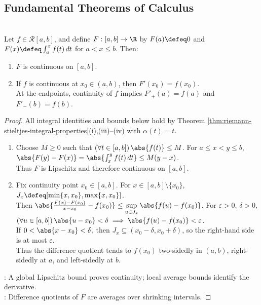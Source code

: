 \subsection{Fundamental Theorems of Calculus}

\begin{theorem} \label{thm:integral-function-continuity-and-derivative} \\
Let $f\in\mathcal{R}[a,b]$, and define $F:[a,b]\to\R$ by $F(a)\defeq0$ and $F(x)\defeq\int_a^x f(t)\,dt$ for $a<x\leq b$. Then:
\begin{enumerate}[label=(\roman*)]
\setlength{\itemsep}{0pt}
\item $F$ is continuous on $[a,b]$.
\item If $f$ is continuous at $x_0\in(a,b)$, then $F'(x_0)=f(x_0)$.\\
At the endpoints, continuity of $f$ implies $F'_+(a)=f(a)$ and $F'_-(b)=f(b)$.
\end{enumerate}
\begin{proof}
All integral identities and bounds below hold by Theorem \ref{thm:riemann-stieltjes-integral-properties}(i),(iii)--(iv) with $\alpha(t)=t$.
\begin{enumerate}[label=(\roman*)]
\setlength{\itemsep}{0pt}
\item Choose $M\geq0$ such that $(\forall t\in[a,b])\,\abs{f(t)}\leq M$. For $a\leq x<y\leq b$, $\abs{F(y)-F(x)}=\abs{\int_x^y f(t)\,dt}\leq M(y-x)$.\\
Thus $F$ is Lipschitz and therefore continuous on $[a,b]$.
\item Fix continuity point $x_0\in[a,b]$. For $x\in[a,b]\setminus\{x_0\}$, $J_x\defeq[\min\{x,x_0\},\max\{x,x_0\}]$.\\
Then $\abs{\frac{F(x)-F(x_0)}{x-x_0}-f(x_0)}\leq\sup\limits_{u\in J_x}\abs{f(u)-f(x_0)}$. For $\varepsilon>0$, $\delta>0$, $(\forall u\in[a,b])\,\abs{u-x_0}<\delta\implies\abs{f(u)-f(x_0)}<\varepsilon$.\\
If $0<\abs{x-x_0}<\delta$, then $J_x\subseteq(x_0-\delta,x_0+\delta)$, so the right-hand side is at most $\varepsilon$.\\
Thus the difference quotient tends to $f(x_0)$ two-sidedly in $(a,b)$, right-sidedly at $a$, and left-sidedly at $b$.
\end{enumerate}
: A global Lipschitz bound proves continuity; local average bounds identify the derivative.\\
: Difference quotients of $F$ are averages over shrinking intervals.
\end{proof}
\end{theorem}

